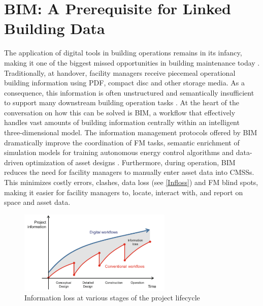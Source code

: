 \section{\ac{BIM}: A Prerequisite for Linked Building Data }
\label{BIM}   
The application of digital tools in building operations remains in its infancy, making it one of the biggest missed opportunities in building maintenance today \citep{Borrmann2010, Susan2023MindData}. Traditionally, at handover, facility managers receive piecemeal operational building information using \ac{PDF}, compact disc and other storage media. As a consequence, this information is often unstructured and semantically insufficient to support many downstream building operation tasks \citep{Zhang2015, Chen2018, Lu2019, Mason2019}. At the heart of the conversation on how this can be solved is \ac{BIM}, a workflow that effectively handles vast amounts of building information centrally within an intelligent three-dimensional model. The information management protocols offered by \ac{BIM} dramatically improve the coordination of \ac{FM} tasks, semantic enrichment of simulation models for training autonomous energy control algorithms \citep{Mason2019} and data-driven optimization of asset designs \citep{Lu2019b}. Furthermore, during operation, \ac{BIM} reduces the need for facility managers to manually enter asset data into \acp{CMSS}. This minimizes costly errors, clashes, data loss (see \autoref{Infloss}) and \ac{FM} blind spots, making it easier for facility managers to, locate, interact with, and report on space and asset data. 

\begin{figure}[!b]
	\centering
	\includegraphics[width=0.65\textwidth]{figures/Informationloss}
	\caption{Information loss at various stages of the project lifecycle \citep{Borrmann2010}}
	\label{Infloss}
\end{figure}

